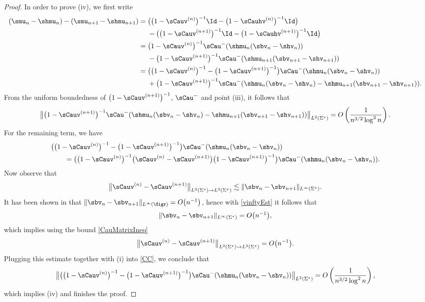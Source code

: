 \begin{proof}
In order to prove (iv), we first write
\begin{align*}
 (\smu_n - \shmu_n)-(\smu_{n+1} - \shmu_{n+1})={}&\big(\big(1-\sCauv^{(n)}\big)^{-1} \Id - \big(1-\sCauhv^{(n)}\big)^{-1}\Id\big)
 \\
 &-\big(\big(1-\sCauv^{(n+1)}\big)^{-1} \Id - \big(1-\sCauhv^{(n+1)}\big)^{-1}\Id\big)
 \\
={}& \big(1-\sCauv^{(n)}\big)^{-1}\sCau^-(\shmu_n(\sbv_n-\shv_n))
 \\
 & -\big(1-\sCauv^{(n+1)}\big)^{-1}\sCau^-(\shmu_{n+1}(\sbv_{n+1}-\shv_{n+1}))
 \\
={}& \big(\big(1-\sCauv^{(n)}\big)^{-1}-\big(1-\sCauv^{(n+1)}\big)^{-1}\big)\sCau^-(\shmu_n(\sbv_n-\shv_n))
 \\
 & + \big(1-\sCauv^{(n+1)}\big)^{-1}\sCau^-(\shmu_n(\sbv_n-\shv_n)-\shmu_{n+1}(\sbv_{n+1}-\shv_{n+1})).
\end{align*}
From the uniform boundedness of $\big(1-\sCauv^{(n+1)}\big)^{-1}$, $\sCau^-$ and point (iii), it follows that
\begin{align*}
 \big\Vert \big(1-\sCauv^{(n+1)}\big)^{-1}\sCau^-(\shmu_n(\sbv_n-\shv_n)-\shmu_{n+1}(\sbv_{n+1}-\shv_{n+1})) \big\Vert_{L^2(\Sigma^\star)} = O\left(\frac{1}{n^{3/2}\log^2 n}\right).
\end{align*}
For the remaining term, we have
\begin{align}
 &\big(\big(1-\sCauv^{(n)}\big)^{-1}-\big(1-\sCauv^{(n+1)}\big)^{-1}\big)\sCau^-(\shmu_n(\sbv_n-\shv_n))\nonumber
 \\
 &\qquad= \big(\big(1-\sCauv^{(n)}\big)^{-1}\big(\sCauv^{(n)}-\sCauv^{(n+1)}\big)\big(1-\sCauv^{(n+1)}\big)^{-1}\big)\sCau^-(\shmu_n(\sbv_n-\shv_n)).\label{CC}
\end{align}
Now observe that
\begin{align}\label{CauMatrixIneq}
 \big\Vert \sCauv^{(n)}-\sCauv^{(n+1)} \big\Vert_{L^2(\Sigma^\star)\to L^2(\Sigma^\star)} \lesssim \Vert \sbv_n - \sbv_{n+1} \Vert_{L^\infty(\Sigma^\star)}.
\end{align}
It has been shown in \cite[p.~54]{CD} that $\Vert \sbv_n - \sbv_{n+1} \Vert_{L^\infty(\Sigr)}=O\big(n^{-1}\big)$, hence with \eqref{vinftyEst} it follows that
\begin{align*}
 \Vert \sbv_n - \sbv_{n+1} \Vert_{L^\infty(\Sigma^\star)} = O\big(n^{-1}\big),
\end{align*}
which implies using the bound \eqref{CauMatrixIneq}
\begin{align*}
 \big\Vert \sCauv^{(n)}-\sCauv^{(n+1)} \big\Vert_{L^2(\Sigma^\star)\to L^2(\Sigma^\star)} = O\big(n^{-1}\big).
\end{align*}
Plugging this estimate together with (i) into \eqref{CC}, we conclude that
\begin{align*}
 \big\Vert \big(\big(1-\sCauv^{(n)}\big)^{-1}-\big(1-\sCauv^{(n+1)}\big)^{-1}\big)\sCau^-(\shmu_n(\sbv_n-\shv_n))\big\Vert_{L^2(\Sigma^\star)} = O\left(\frac{1}{n^{3/2}\log^2 n}\right),
\end{align*}
which implies (iv) and finishes the proof.
\end{proof}

